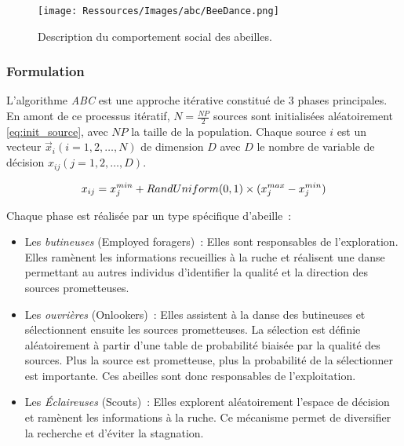 \begin{figure}
    \begin{center}
        \texttt{[image: Ressources/Images/abc/BeeDance.png]}
    \end{center}
    \caption{Description du comportement social des abeilles.
             \label{fig:bee_dance}}
\end{figure}
\FloatBarrier


\subsubsection{Formulation} %
\label{ssub:formulation}
L’algorithme \textit{ABC} est une approche itérative constitué de 3 phases principales.
En amont de ce processus itératif, $N = \frac{NP}{2}$ sources sont initialisées
aléatoirement \eqref{eq:init_source}, avec $NP$ la taille de la population.
Chaque source $i$ est un vecteur $\vec{x}_{i}(i = 1, 2, \dotsc, N)$ de dimension $D$
avec $D$ le nombre de variable de décision $x_{ij} (j = 1, 2, \dotsc, D)$.

\begin{equation}\label{eq:init_source}
  x_{ij} = x_{j}^{min} + RandUniform(0, 1) \times (x_{j}^{max} - x_{j}^{min}) \\
\end{equation}

\noindent Chaque phase est réalisée par un type spécifique d’abeille~:
\begin{itemize}
  \item Les \emph{butineuses} (Employed foragers)~: Elles sont responsables de l’exploration.
        Elles ramènent les informations recueillies à la ruche et réalisent une danse
        permettant au autres individus d’identifier la qualité et la direction des
        sources prometteuses.
  \item Les \emph{ouvrières} (Onlookers)~: Elles assistent à la danse des butineuses
        et sélectionnent ensuite les sources prometteuses. La sélection est définie
        aléatoirement à partir d’une table de probabilité biaisée par la qualité des sources.
        Plus la source est prometteuse, plus la probabilité de la sélectionner est importante.
        Ces abeilles sont donc responsables de l’exploitation.
  \item Les \emph{Éclaireuses} (Scouts)~: Elles explorent aléatoirement l’espace
        de décision et ramènent les informations à la ruche. Ce mécanisme
        permet de diversifier la recherche et d’éviter la stagnation.
\end{itemize}

